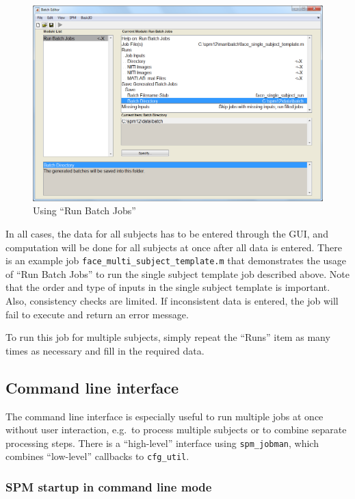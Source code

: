 \begin{figure}[htbp]
  \centering
  \includegraphics[width=.9\linewidth]{batch/batch_multi_subject_template}

  \caption{Using ``Run Batch Jobs''}
  \label{fig:batch_multi_subject_template}
\end{figure}

In all cases, the data for all subjects has to be entered through the
GUI, and computation will be done for all subjects at once after all
data is entered. There is an example job
\verb|face_multi_subject_template.m| that demonstrates the usage of
``Run Batch Jobs'' to run the single subject template job described
above. Note that the order and type of inputs in the single subject
template is important. Also, consistency checks are limited. If
inconsistent data is entered, the job will fail to execute and return
an error message.

To run this job for multiple subjects, simply repeat the ``Runs'' item
as many times as necessary and fill in the required data.

\subsection{Command line interface}
\label{sec:batch_interface_cmd}

The command line interface is especially useful to run multiple jobs
at once without user interaction, e.g.\ to process multiple subjects
or to combine separate processing steps. There is a ``high-level''
interface using \verb|spm_jobman|, which combines ``low-level''
callbacks to \verb|cfg_util|.

\subsubsection{SPM startup in command line mode}
\label{sec:batch_interface_spm_startup}

